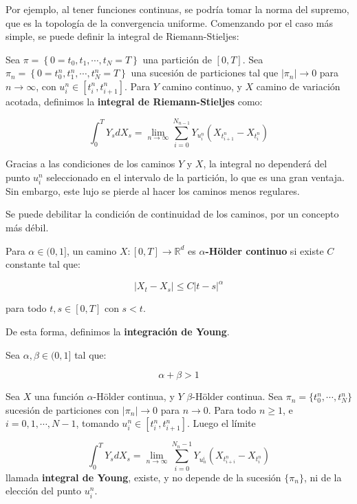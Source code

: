Por ejemplo, al tener funciones continuas, se podría tomar la norma del supremo, que es la topología de la convergencia uniforme. Comenzando por el caso más simple, se puede definir la integral de Riemann-Stieljes:

\begin{boxDef}
	Sea $\pi = \left\{ 0 = t_0, t_1, \cdots, t_N  = T\right\}$ una partición de $[0,T]$. Sea $\pi_n  = \left\{ 0 = t_0^n, t_1^n, \cdots, t_N^n  = T\right\} $ una sucesión de particiones tal que $\lvert \pi_n \rvert \rightarrow 0$ para $n \rightarrow \infty$, con $u_i^n \in [t_i^n, t_{i+1}^n]$. Para $Y$ camino continuo, y $X$ camino de variación acotada, definimos la \textbf{integral de Riemann-Stieljes} como:

	\[
		\int_0^T Y_s dX_s = \lim_{n \rightarrow \infty} \sum_{i = 0}^{N_{n-1} } Y_{u_i^n} (X_{t_{i+1}^n} -  X_{t_i^n})
	\]

\end{boxDef}

Gracias a las condiciones de los caminos $Y$ y $X$, la integral no dependerá del punto $u_i^n$ seleccionado en el intervalo de la partición, lo que es una gran ventaja. Sin embargo, este lujo se pierde al hacer los caminos menos regulares.

Se puede debilitar la condición de continuidad de los caminos, por un concepto más débil.

\begin{boxDef}
	Para $\alpha \in (0, 1]$, un camino $X: [0, T] \rightarrow \mathbb{R}^d$ es $\alpha$\textbf{-Hölder continuo} si existe $C$ constante tal que:

	\[
		\lvert X_t - X_s \rvert \leq C \lvert t - s \rvert^{\alpha}
	\]

	para todo $t, s \in [0, T]$ con $s < t$.
\end{boxDef}

De esta forma, definimos la \textbf{integración de Young}.

\begin{theorem}
	Sea $\alpha, \beta \in (0, 1]$ tal que:

	\[
		\alpha + \beta > 1
	\]

	Sea $X$ una función $\alpha$-Hölder continua, y $Y$ $\beta$-Hölder continua. Sea $\pi_n = \{ t_0^n, \cdots, t_N^n  \}$ sucesión de particiones con $\lvert \pi_n \rvert \rightarrow 0$ para $n \rightarrow 0$. Para todo $n \geq 1$, e $i = 0, 1, \cdots, N - 1$, tomando $u_i^n \in [t_i^n, t_{i+1}^n]$. Luego el límite

	\[
		\int_0^T Y_s dX_s = \lim_{n \rightarrow \infty} \sum_{i = 0}^{N_n - 1} Y_{u_n^i} (X_{t_{i+i}^n} - X_{t_i^n} )
	\] 
	llamada \textbf{integral de Young}, existe, y no depende de la sucesión $\{ \pi_n \}$, ni de la elección del punto $u_i^n$.

\end{theorem}

